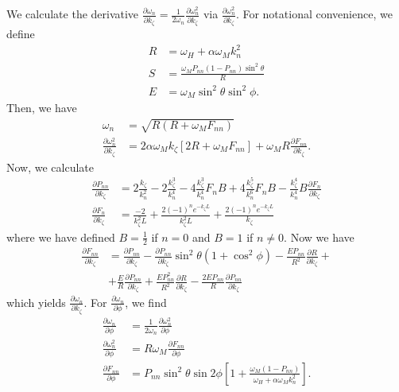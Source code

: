 \documentclass{article}
\begin{document}
We calculate the derivative $\frac{\partial \omega_{n}}{\partial k_{\zeta}} = \frac{1}{2 \omega_{n}} \frac{\partial \omega_{n}^2}{\partial k_{\zeta}}$ via $\frac{\partial \omega_{n}^2}{\partial k_{\zeta}}$. For notational convenience, we define 
\begin{align}
R &= \omega_{H} + \alpha \omega_{M} k_{n}^2 \\
S &= \frac{\omega_{M} P_{nn} (1 - P_{nn}) \sin^2{\theta}}{R} \\
E &= \omega_{M} \sin^2{\theta} \sin^2{\phi}.
\end{align}
Then, we have
\begin{align}
\omega_{n} &= \sqrt{R(R + \omega_{M} F_{nn})} \\
\frac{\partial \omega_{n}^2}{\partial k_{\zeta}} &= 2  \alpha \omega_{M} k_{\zeta} \left[2R + \omega_{M} F_{nn} \right] + \omega_{M} R \frac{\partial F_{nn}}{\partial k_{\zeta}}.
\end{align}
Now, we calculate
\begin{align}
\frac{\partial P_{nn}}{\partial k_{\zeta}} &= 2 \frac{k_{\zeta}}{k_{n}^{2}} - 2 \frac{k_{\zeta}^3}{k_{n}^{4}} - 4 \frac{k_{\zeta}^3}{k_{n}^{4}}   F_{n} B + 4 \frac{k_{\zeta}^5}{k_{n}^{6}} F_{n} B - \frac{k_{\zeta}^4}{k_{n}^{4}} B \frac{\partial F_{n}}{\partial k_{\zeta}} \\
\frac{\partial F_{n}}{\partial k_{\zeta}} &= \frac{-2}{k_{\zeta}^2 L} + \frac{2 (-1)^n e^{-k_{\zeta} L}}{k_{\zeta}^2 L} + \frac{2 (-1)^n e^{-k_{\zeta} L}}{k_{\zeta}}
\end{align}
where we have defined $B = \frac{1}{2}$ if $n=0$ and $B=1$ if $n \neq 0$.
Now we have
\begin{align}
\frac{\partial F_{nn}}{\partial k_{\zeta}} &= \frac{\partial P_{nn}}{\partial k_{\zeta}} - \frac{\partial P_{nn}}{\partial k_{\zeta}} \sin^2{\theta} (1 + \cos^2{\phi}) - \frac{E P_{nn}}{R^2} \frac{\partial R}{\partial k_{\zeta}} + \\
&+ \frac{E}{R} \frac{\partial P_{nn}}{\partial k_{\zeta}}  + \frac{E P_{nn}^2}{R^2} \frac{\partial R}{\partial k_{\zeta}} - \frac{2 E P_{nn}}{R} \frac{\partial P_{nn}}{\partial k_{\zeta}} \nonumber
\end{align}
which yields $\frac{\partial \omega_{n}}{\partial k_{\zeta}}$. For $\frac{\partial \omega_{n}}{\partial \phi}$, we find
\begin{align}
\frac{\partial \omega_{n}}{\partial \phi} &= \frac{1}{2 \omega_{n}} \frac{\partial \omega_{n}^2}{\partial \phi} \\
\frac{\partial \omega_{n}^2}{\partial \phi} &= R \omega_{M} \frac{\partial F_{nn}}{\partial \phi} \\
\frac{\partial F_{nn}}{\partial \phi} &= P_{nn} \sin^2{\theta} \sin{2\phi} \left[ 1 + \frac{\omega_{M} (1 - P_{nn})}{\omega_{H} + \alpha \omega_{M} k_{n}^2} \right].
\end{align}
\end{document}
